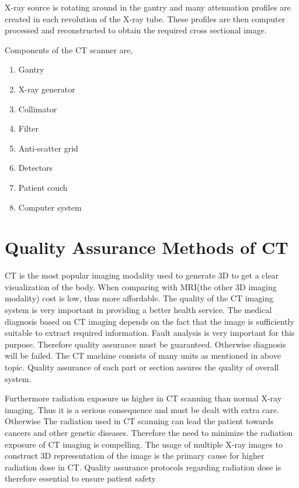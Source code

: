 \documentclass[12pt]{article}
\begin{document}
X-ray source is rotating around in the gantry and many attenuation profiles are created in each revolution of the X-ray tube. These profiles are then computer processed and reconstructed to obtain the required cross sectional image.

Components of the CT scanner are,
\begin{enumerate}
    \item Gantry
    \item X-ray generator
    \item Collimator
    \item Filter
    \item Anti-scatter grid
    \item Detectors
    \item Patient couch
    \item Computer system
    
\end{enumerate}

\pagebreak

\section{Quality Assurance Methods of CT}
CT is the most popular imaging modality used to generate 3D to get a clear visualization of the body. When comparing with MRI(the other 3D imaging modality) cost is low, thus more affordable. The quality of the CT imaging system is very important in providing a better health service. The medical diagnosis based on CT imaging depends on the fact that the image is sufficiently suitable to extract required information. Fault analysis is very important for this purpose. Therefore quality assurance must be guaranteed. Otherwise diagnosis will be failed. 
The CT machine consists of many units as mentioned in above topic. Quality assurance of each part or section assures the quality of overall system. 

Furthermore radiation exposure us higher in CT scanning than normal X-ray imaging. Thus it is a serious consequence and must be dealt with extra care. Otherwise The radiation used in CT scanning can lead the patient towards cancers and other genetic diseases. Therefore the need to minimize the radiation exposure of CT imaging is compelling. The usage of multiple X-ray images to construct 3D representation of the image is the primary cause for higher radiation dose in CT. Quality assurance protocols regarding radiation dose is therefore essential to ensure patient safety
\end{document}
